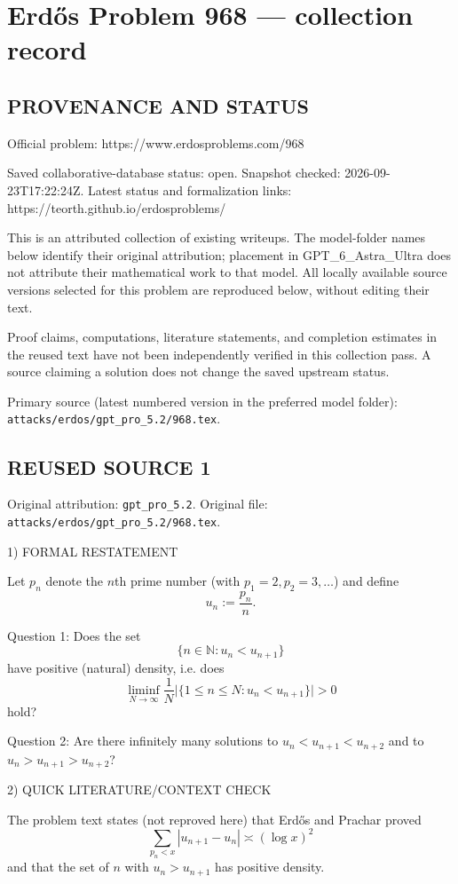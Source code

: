 \section*{Erd\H{o}s Problem 968 --- collection record}

\subsection*{PROVENANCE AND STATUS}
Official problem: https://www.erdosproblems.com/968

Saved collaborative-database status: open.
Snapshot checked: 2026-09-23T17:22:24Z.
Latest status and formalization links: https://teorth.github.io/erdosproblems/

This is an attributed collection of existing writeups. The model-folder names below identify their original attribution; placement in GPT\_6\_Astra\_Ultra does not attribute their mathematical work to that model. All locally available source versions selected for this problem are reproduced below, without editing their text.

Proof claims, computations, literature statements, and completion estimates in the reused text have not been independently verified in this collection pass. A source claiming a solution does not change the saved upstream status.

Primary source (latest numbered version in the preferred model folder): \texttt{attacks/erdos/gpt\_pro\_5.2/968.tex}.

\subsection*{REUSED SOURCE 1}
Original attribution: \texttt{gpt\_pro\_5.2}.
Original file: \texttt{attacks/erdos/gpt\_pro\_5.2/968.tex}.


1) FORMAL RESTATEMENT

Let $p_n$ denote the $n$th prime number (with $p_1=2,p_2=3,\dots$) and define
\[
 u_n := \frac{p_n}{n}.
\]

Question 1: Does the set
\[
\{n\in\mathbb N: u_n < u_{n+1}\}
\]
have positive (natural) density, i.e. does
\[
\liminf_{N\to\infty} \frac{1}{N}\bigl|\{1\le n\le N: u_n<u_{n+1}\}\bigr| >0
\]
hold?

Question 2: Are there infinitely many solutions to $u_n<u_{n+1}<u_{n+2}$ and to $u_n>u_{n+1}>u_{n+2}$?

2) QUICK LITERATURE/CONTEXT CHECK

The problem text states (not reproved here) that Erd\H{o}s and Prachar proved
\[
\sum_{p_n<x} |u_{n+1}-u_n| \asymp (\log x)^2
\]
and that the set of $n$ with $u_n>u_{n+1}$ has positive density.

